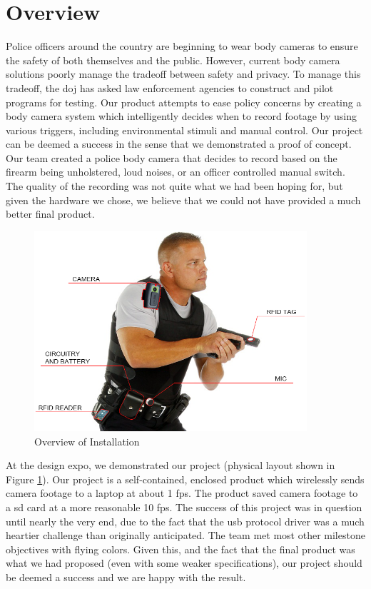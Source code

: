 \documentclass[12pt]{article}
\begin{document}
\section{Overview}
Police officers around the country are beginning to wear body cameras to ensure
the safety of both themselves and the public. However, current body camera
solutions poorly manage the tradeoff between safety and privacy. To manage this
tradeoff, the \gls{doj} has asked law enforcement agencies to construct and
pilot programs for testing\cite{officer_privacy}.  Our product attempts to ease
policy concerns by creating a body camera system which intelligently decides
when to record footage by using various triggers, including environmental
stimuli and manual control.  Our project can be deemed a success in the sense
that we demonstrated a proof of concept. Our team created a police body camera
that decides to record based on the firearm being unholstered, loud noises, or
an officer controlled manual switch.  The quality of the recording was not
quite what we had been hoping for, but given the hardware we chose, we believe
that we could not have provided a much better final product. 

\begin{figure}[h]
    \centering
    \includegraphics[width=0.9\textwidth]{installation}
    \caption{Overview of Installation}
    \label{fig:installation}
\end{figure}

At the design expo, we demonstrated our project (physical layout shown in
Figure \ref{fig:installation}).  Our project is a self-contained, enclosed
product which wirelessly sends camera footage to a laptop at about 1 \gls{fps}.
The product saved camera footage to a \gls{sd} card at a more reasonable 10
\gls{fps}.  The success of this project was in question until nearly the very
end, due to the fact that the \gls{usb} protocol driver was a much heartier
challenge than originally anticipated. The team met most other milestone
objectives with flying colors. Given this, and the fact that the final product
was what we had proposed (even with some weaker specifications), our project
should be deemed a success and we are happy with the result.
\end{document}
